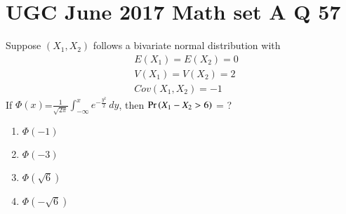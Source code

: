 \documentclass[journal,12pt,twocolumn]{IEEEtran}
\begin{document}
\section*{UGC June 2017 Math set A Q 57 }
Suppose $(X_1,X_2)$ follows a bivariate  normal distribution with
\begin{align}
    &E(X_1)=E(X_2)=0\\
    &V(X_1)=V(X_2)=2\\
    &Cov(X_1,X_2)=-1
\end{align}
If $\Phi(x)$=$\frac{1}{ \sqrt{2\pi}}\int_{-\infty}^{x}e^{-\frac{{y}^2}{2}}\, dy$, then $\Pr\left(X_1-X_2>6\right)$ = ?

\begin{enumerate}
    \item $\Phi(-1)$
    \item $\Phi(-3)$
    \item $\Phi(\sqrt{6})$
    \item $\Phi(-\sqrt{6})$
\end{enumerate}
\end{document}
